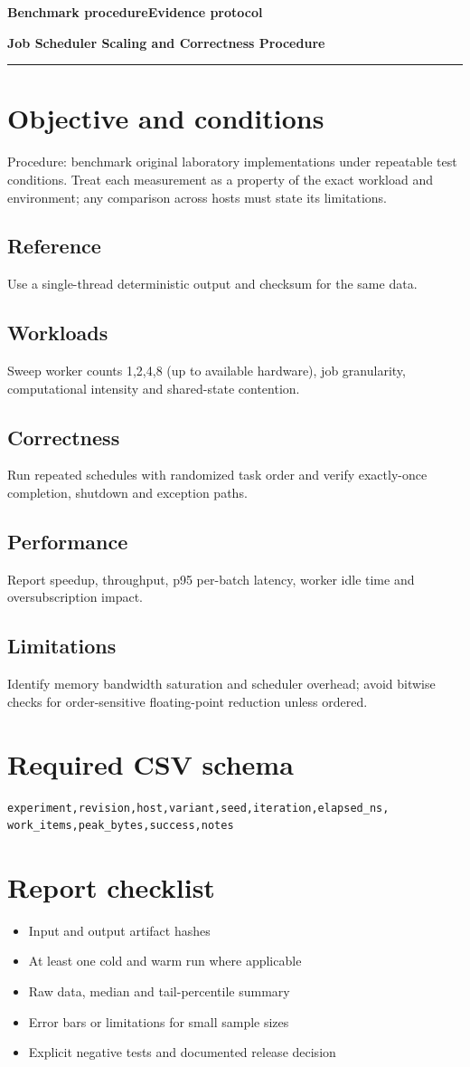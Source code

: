 \documentclass[11pt,letterpaper]{article}
\newcommand{\DocType}{Reference}
\newcommand{\SuiteHeading}[3]{%
\renewcommand{\DocType}{#2}%
{\small\bfseries\sffamily\color{EngineTeal}#2\hfill #3}\par\vspace{6pt}
{\LARGE\bfseries\color{EngineBlue}#1}\par\vspace{4pt}
{\color{EngineTeal}\rule{\linewidth}{1pt}}\par\vspace{7pt}}
\begin{document}
\SuiteHeading{Job Scheduler Scaling and Correctness Procedure}{Benchmark procedure}{Evidence protocol}
\section{Objective and conditions}
Procedure: benchmark original laboratory implementations under repeatable test conditions. Treat each measurement as a property of the exact workload and environment; any comparison across hosts must state its limitations.

\subsection{Reference}
Use a single-thread deterministic output and checksum for the same data.

\subsection{Workloads}
Sweep worker counts 1,2,4,8 (up to available hardware), job granularity, computational intensity and shared-state contention.

\subsection{Correctness}
Run repeated schedules with randomized task order and verify exactly-once completion, shutdown and exception paths.

\subsection{Performance}
Report speedup, throughput, p95 per-batch latency, worker idle time and oversubscription impact.

\subsection{Limitations}
Identify memory bandwidth saturation and scheduler overhead; avoid bitwise checks for order-sensitive floating-point reduction unless ordered.

\section{Required CSV schema}
\begin{verbatim}
experiment,revision,host,variant,seed,iteration,elapsed_ns,
work_items,peak_bytes,success,notes
\end{verbatim}\section{Report checklist}
\begin{itemize}
\item Input and output artifact hashes
\item At least one cold and warm run where applicable
\item Raw data, median and tail-percentile summary
\item Error bars or limitations for small sample sizes
\item Explicit negative tests and documented release decision
\end{itemize}
\end{document}
